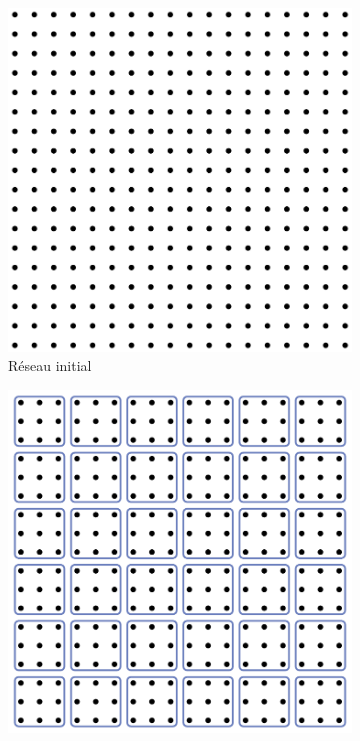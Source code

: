 \documentclass[xcolor=dvipsnames]{beamer}
\begin{document}
\begin{frame}

\begin{figure}[htp]
\centering
\begin{subfigure}{.25\textwidth}
	\centering
	\includegraphics[width=.9\linewidth]{img/renorm_step0.pdf}
	\caption{Réseau initial}
	\end{subfigure}%
\begin{subfigure}{.25\textwidth}
	\centering
	\includegraphics[width=.9\linewidth]{img/renorm_step1.pdf}

\end{subfigure}
\end{figure}
\end{frame}
\end{document}
